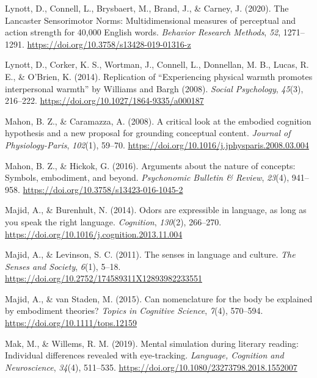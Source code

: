 \documentclass[
  12pt,
  man,floatsintext]{apa7}
\newlength{\cslhangindent}
\newlength{\cslentryspacingunit} %
\newenvironment{CSLReferences}[2] %
 {%
  \setlength{\parindent}{0pt}
  \ifodd #1
  \let\oldpar\par
  \def\par{\hangindent=\cslhangindent\oldpar}
  \fi
  \setlength{\parskip}{#2\cslentryspacingunit}
 }%
 {}
\begin{document}
\begin{CSLReferences}{1}{0}
\leavevmode{}%
Lynott, D., Connell, L., Brysbaert, M., Brand, J., \& Carney, J. (2020). The {Lancaster Sensorimotor Norms}: {Multidimensional} measures of perceptual and action strength for 40,000 {English} words. \emph{Behavior Research Methods}, \emph{52}, 1271--1291. \url{https://doi.org/10.3758/s13428-019-01316-z}

\leavevmode{}%
Lynott, D., Corker, K. S., Wortman, J., Connell, L., Donnellan, M. B., Lucas, R. E., \& O'Brien, K. (2014). Replication of {``{Experiencing} physical warmth promotes interpersonal warmth''} by {Williams} and {Bargh} (2008). \emph{Social Psychology}, \emph{45}(3), 216--222. \url{https://doi.org/10.1027/1864-9335/a000187}

\leavevmode{}%
Mahon, B. Z., \& Caramazza, A. (2008). A critical look at the embodied cognition hypothesis and a new proposal for grounding conceptual content. \emph{Journal of Physiology-Paris}, \emph{102}(1), 59--70. \url{https://doi.org/10.1016/j.jphysparis.2008.03.004}

\leavevmode{}%
Mahon, B. Z., \& Hickok, G. (2016). Arguments about the nature of concepts: {Symbols}, embodiment, and beyond. \emph{Psychonomic Bulletin \& Review}, \emph{23}(4), 941--958. \url{https://doi.org/10.3758/s13423-016-1045-2}

\leavevmode{}%
Majid, A., \& Burenhult, N. (2014). Odors are expressible in language, as long as you speak the right language. \emph{Cognition}, \emph{130}(2), 266--270. \url{https://doi.org/10.1016/j.cognition.2013.11.004}

\leavevmode{}%
Majid, A., \& Levinson, S. C. (2011). The senses in language and culture. \emph{The Senses and Society}, \emph{6}(1), 5--18. \url{https://doi.org/10.2752/174589311X12893982233551}

\leavevmode{}%
Majid, A., \& van Staden, M. (2015). Can nomenclature for the body be explained by embodiment theories? \emph{Topics in Cognitive Science}, \emph{7}(4), 570--594. \url{https://doi.org/10.1111/tops.12159}

\leavevmode{}%
Mak, M., \& Willems, R. M. (2019). Mental simulation during literary reading: {Individual} differences revealed with eye-tracking. \emph{Language, Cognition and Neuroscience}, \emph{34}(4), 511--535. \url{https://doi.org/10.1080/23273798.2018.1552007}


\end{CSLReferences}
\end{document}
